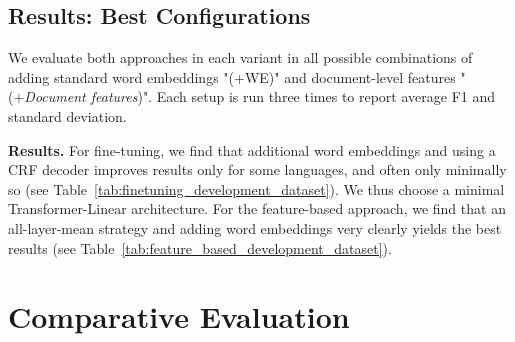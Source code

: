 \documentclass[11pt,a4paper]{article}
\begin{document}
\subsection{Results: Best Configurations}
\vspace{-1mm}

We evaluate both approaches in each variant in all possible combinations of adding standard word embeddings "(+WE)" and document-level features "(+\textit{Document features})". Each setup is run three times to report average F1 and standard deviation.


\noindent
\textbf{Results.} For fine-tuning, we find that additional word embeddings and using a CRF decoder improves results only for some languages, and often only minimally so (see Table~\ref{tab:finetuning_development_dataset}). We thus choose a minimal Transformer-Linear architecture. For the feature-based approach, we find that an all-layer-mean strategy and adding word embeddings very clearly yields the best results (see Table~\ref{tab:feature_based_development_dataset}). 








\begin{table}
\centering
{}
\vspace{-2mm}
\caption{Comparative evaluation of context window sizes of fine-tuning approach on development set.}
\label{tab:comparison_different_context_window_sizes}
\end{table}


\section{Comparative Evaluation}
\label{sec:evaluation}
\vspace{-1mm}
\end{document}
